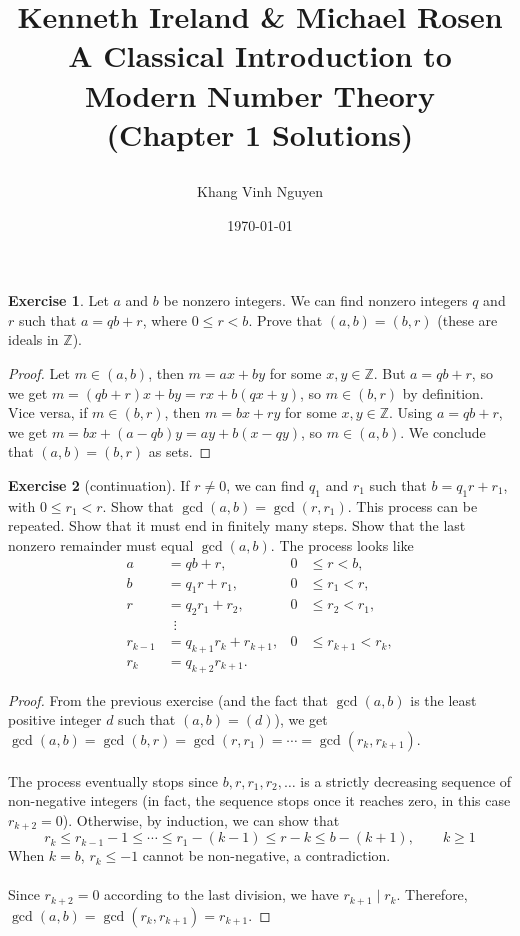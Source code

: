 \documentclass{article}
\title{
	\textbf{Kenneth Ireland \& Michael Rosen \\
		A Classical Introduction to Modern Number Theory \\
		(Chapter 1 Solutions)}
	\author{Khang Vinh Nguyen}
}
\date{\today}
\theoremstyle{definition}
\newtheorem{exercise}{Exercise}
\begin{document}
\maketitle

\newpage

\begin{exercise} \label{c1-ex-1}
Let $a$ and $b$ be nonzero integers. We can find nonzero integers $q$ and $r$ such that $a = qb + r$, where $0 \leq r < b$. Prove that $(a, b) = (b, r)$ (these are ideals in $\mathbb{Z}$).
\end{exercise}
\begin{proof}
Let $m \in (a, b)$, then $m = ax + by$ for some $x, y \in \mathbb{Z}$. But $a = qb + r$, so we get $m = (qb + r) x + by = r x + b (qx + y)$, so $m \in (b, r)$ by definition. Vice versa, if $m \in (b, r)$, then $m = bx + ry$ for some $x, y \in \mathbb{Z}$. Using $a = qb + r$, we get $m = bx + (a - qb) y = ay + b(x - qy)$, so $m \in (a, b)$. We conclude that $(a, b) = (b, r)$ as sets.
\end{proof}

\newpage

\begin{exercise}[continuation] \label{c1-ex-2}
If $r \neq 0$, we can find $q_1$ and $r_1$ such that $b = q_1 r + r_1$, with $0 \leq r_1 < r$. Show that $\gcd(a, b) = \gcd(r, r_1)$. This process can be repeated. Show that it must end in finitely many steps. Show that the last nonzero remainder must equal $\gcd(a, b)$. The process looks like
\begin{align*}
a & = qb + r, & 0 & \leq r < b, \\
b & = q_1 r + r_1, & 0 & \leq r_1 < r, \\
r & = q_2 r_1 + r_2, & 0 & \leq r_2 < r_1, \\
& \enspace\vdots & & \\
r_{k - 1} & = q_{k + 1} r_k + r_{k + 1}, & 0 & \leq r_{k + 1} < r_k, \\
r_k & = q_{k + 2} r_{k + 1}. & & 
\end{align*}
\end{exercise}
\begin{proof}
From the previous exercise (and the fact that $\gcd(a, b)$ is the least positive integer $d$ such that $(a, b) = (d)$), we get $\gcd(a, b) = \gcd(b, r) = \gcd(r, r_1) = \cdots = \gcd(r_k, r_{k + 1})$.
\\
\\
The process eventually stops since $b, r, r_1, r_2, \hdots$ is a strictly decreasing sequence of non-negative integers (in fact, the sequence stops once it reaches zero, in this case $r_{k + 2} = 0$).  Otherwise, by induction, we can show that
$$r_k \leq r_{k - 1} - 1 \leq \cdots \leq r_1 - (k - 1) \leq r - k \leq b - (k + 1), \qquad k \geq 1$$
When $k = b$, $r_k \leq -1$ cannot be non-negative, a contradiction.
\\
\\
Since $r_{k + 2} = 0$ according to the last division, we have $r_{k + 1} \mid r_k$. Therefore, $\gcd(a, b) = \gcd(r_k, r_{k + 1}) = r_{k + 1}$.
\end{proof}
\end{document}
